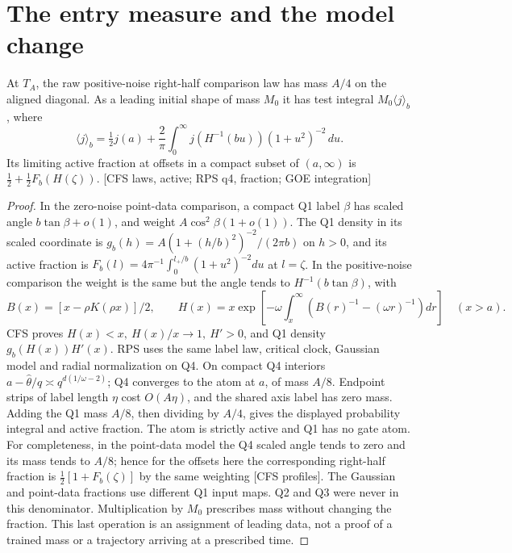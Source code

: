 \documentclass[11pt]{article}
\newcommand{\dd}{\,d}\newcommand{\E}{\mathbb E}
\newcommand{\src}[1]{\textnormal{\small[#1]}}
\begin{document}
\section{The entry measure and the model change}\label{an04rmsv1:entry}
\begin{lemma}\label{an04rmsv1:join}
At \(T_A\), the raw positive-noise right-half comparison law has mass
\(A/4\) on the aligned diagonal. As a leading initial shape of mass
\(M_0\) it has test integral \(M_0\langle j\rangle_b\), where
\[
 \langle j\rangle_b=\tfrac12j(a)+\frac2\pi\int_0^\infty
             j(H^{-1}(bu))(1+u^2)^{-2}\dd u .
\]
Its limiting active fraction at offsets in a compact subset of
\((a,\infty)\) is \(\tfrac12+\tfrac12 F_b(H(\zeta))\).
\src{CFS laws, active; RPS q4, fraction; GOE integration}
\end{lemma}
\begin{proof}
In the zero-noise point-data comparison, a compact Q1 label \(\beta\)
has scaled angle \(b\tan\beta+o(1)\), and weight
\(A\cos^2\beta(1+o(1))\). The Q1 density in its scaled coordinate is
\(g_b(h)=A(1+(h/b)^2)^{-2}/(2\pi b)\) on \(h>0\), and its active
fraction is \(F_b(l)=4\pi^{-1}\int_0^{l_+/b}(1+u^2)^{-2}du\) at \(l=\zeta\).
In the positive-noise comparison the weight is the same but the angle
tends to \(H^{-1}(b\tan\beta)\), with
\[
 B(x)=[x-\rho K(\rho x)]/2,\qquad
 H(x)=x\exp\left[-\omega\int_x^\infty(B(r)^{-1}-(\omega r)^{-1})dr\right]
 \quad(x>a).
\]
CFS proves \(H(x)<x,\ H(x)/x\to1,\ H'>0\), and Q1 density
\(g_b(H(x))H'(x)\). RPS uses the same label law, critical clock,
Gaussian model and radial normalization on Q4. On compact Q4
interiors \(a-\widehat\theta/q\asymp q^{d(1/\omega-2)}\);
Q4 converges to the atom at \(a\), of mass \(A/8\).
Endpoint strips of label length \(\eta\) cost \(O(A\eta)\), and
the shared axis label has zero mass. Adding the Q1 mass \(A/8\),
then dividing by \(A/4\), gives the displayed probability integral
and active fraction. The atom is strictly active and Q1 has no gate
atom. For completeness, in the point-data model the Q4 scaled angle
tends to zero and its mass tends to \(A/8\); hence for the offsets here
the corresponding right-half fraction is \(\tfrac12[1+F_b(\zeta)]\)
by the same weighting \src{CFS profiles}. The Gaussian and point-data
fractions use different Q1 input maps. Q2 and Q3 were never in this denominator. Multiplication by
\(M_0\) prescribes mass without changing the fraction. This last
operation is an assignment of leading data, not a proof of a
trained mass or a trajectory arriving at a prescribed time.
\end{proof}
\end{document}
